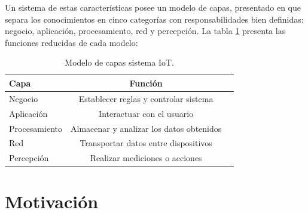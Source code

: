 Un sistema de estas características posee un modelo de capas, presentado en \citep{ARTICLE:4} que separa los conocimientos en cinco categorías con responsabilidades bien definidas: negocio, aplicación, procesamiento, red y percepción. La tabla \ref{tab:Modelo_capas} presenta las funciones reducidas de cada modelo:


\begin{table}[h]
	\centering
	\caption[Modelo de capas IoT]{Modelo de capas sistema IoT.}
	\begin{tabular}{l c c}    
		\toprule
		\textbf{Capa}     & \textbf{Función} \\
		\midrule
		Negocio & Establecer reglas y controlar sistema    \\		
		Aplicación    & Interactuar con el usuario           \\
		Procesamiento  & Almacenar y analizar los datos obtenidos  \\
		Red  & Transportar datos entre dispositivos      \\
		Percepción \citep{ARTICLE:4}  & Realizar mediciones o acciones\\
		\bottomrule
		\hline
	\end{tabular}
	\label{tab:Modelo_capas}
\end{table}






\section{Motivación}
\label{Motivación}


